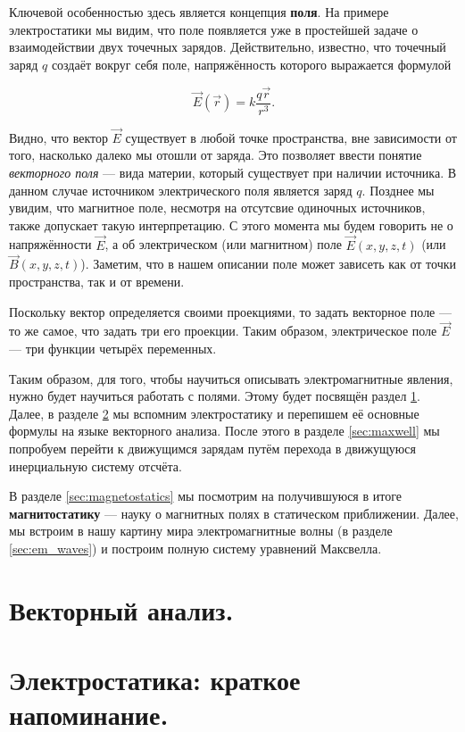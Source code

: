 \documentclass[a4paper,12pt]{article}
\numberwithin{equation}{section}
\begin{document}
Ключевой особенностью здесь является концепция \textbf{поля}. На
примере электростатики мы видим, что поле появляется уже в простейшей
задаче о взаимодействии двух точечных зарядов. Действительно,
известно, что точечный заряд $q$ создаёт вокруг себя поле,
напряжённость которого выражается формулой 

\begin{equation}
  \label{eq:q_E}
  \vec{E} (\vec{r}) = k \frac{q \vec{r}}{r^3}.
\end{equation}

Видно, что вектор $\vec{E}$ существует в любой точке пространства, вне
зависимости от того, насколько далеко мы отошли от заряда. Это
позволяет ввести понятие \textit{векторного поля} --- вида материи,
который существует при наличии источника. В данном случае источником
электрического поля является заряд $q$. Позднее мы увидим, что
магнитное поле, несмотря на отсутсвие одиночных источников, также
допускает такую интерпретацию. С этого момента мы будем говорить не о
напряжённости $\vec{E}$, а об электрическом (или магнитном) поле
$\vec{E}(x,y,z,t)$ (или $\vec{B}(x,y,z,t)$). Заметим, что в нашем
описании поле может зависеть как от точки пространства, так и от
времени.

Поскольку вектор определяется своими проекциями, то задать векторное
поле --- то же самое, что задать три его проекции. Таким образом,
электрическое поле $\vec{E}$ --- три функции четырёх переменных. 

Таким образом, для того, чтобы научиться описывать электромагнитные
явления, нужно будет научиться работать с полями. Этому будет посвящён
раздел \ref{sec:vector_analysis}. Далее, в разделе
\ref{sec:electrostatics} мы вспомним электростатику и перепишем её
основные формулы на языке векторного анализа. После этого в разделе
\ref{sec:maxwell} мы попробуем перейти к движущимся зарядам путём
перехода в движущуюся инерциальную систему отсчёта.

В разделе \ref{sec:magnetostatics} мы посмотрим на получившуюся в
итоге \textbf{магнитостатику} --- науку о магнитных полях в
статическом приближении. Далее, мы встроим в нашу картину мира
электромагнитные волны (в разделе \ref{sec:em_waves}) и построим
полную систему уравнений Максвелла. 

\section{Векторный анализ.}
\label{sec:vector_analysis}

\section{Электростатика: краткое напоминание.}
\label{sec:electrostatics}
\end{document}
